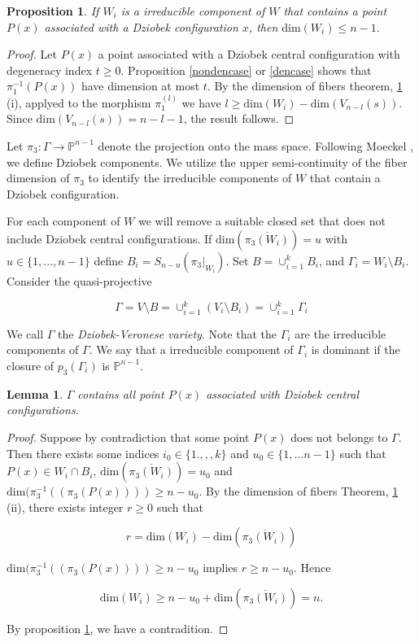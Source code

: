 \documentclass{amsart}
\newtheorem{proposition}[theorem]{Proposition}
\newtheorem{lemma}[theorem]{Lemma}
\theoremstyle{definition}
\theoremstyle{remark}
\numberwithin{equation}{section}
\begin{document}
\begin{proposition}\label{dimfiber}
If $W_i$ is a irreducible component of $W$ that contains a point $P(x)$ associated with a Dziobek configuration $x$, then $\text{dim}(W_i)\leq n-1.$
\end{proposition}
\begin{proof}

 Let $P(x)$ a point associated with a Dziobek central configuration with degeneracy index $t \geq 0$. Proposition \ref{nondencase} or \ref{dencase} shows that $\pi_1^{-1}(P(x))$ have dimension at most $t$. By the dimension of fibers theorem, \ref{dimfiber} (i), applyed to the morphism $\pi_1^{(l)}$ we have $l \geq \text{dim}(W_i)-\text{dim}(V_{n-l}(s))$. Since $\text{dim}(V_{n-l}(s))=n-l-1$, the result follows.
 
\end{proof}





Let $\pi_3: \Gamma \to \mathbb{P}^{n-1}$ denote the projection onto the mass space.  Following Moeckel \cite{moeckel2001generic}, we define Dziobek components. We utilize the upper semi-continuity of the fiber dimension of $\pi_3$ to identify the irreducible components of $W$ that contain a Dziobek configuration.

 For each component of $W$ we will remove a suitable closed set that does not include Dziobek central configurations. If $\text{dim}(\overline{\pi_3(W_i)})=u$ with $u \in\{1,...,n-1\}$ define $B_i=S_{n-u}(\pi_3|_{W_i})$. Set
 $B=\cup_{i=1}^{k}B_i$, and $\Gamma_i=W_i \setminus B_i$. Consider the quasi-projective 

$$\Gamma= V\setminus B=\cup_{i=1}^{k} (V_{i} \setminus B_i)=\cup_{i=1}^k \Gamma_i$$

We call $\Gamma$ the \emph{Dziobek-Veronese variety}. Note that the $\Gamma_i$ are the irreducible components of $\Gamma.$ We say that a irreducible component of $\Gamma_i$ is dominant if the closure of $p_3(\Gamma_i)$ is $\mathbb{P}^{n-1}$.

\begin{lemma} 
  $\Gamma$ contains all point $P(x)$ associated with Dziobek central configurations.
\end{lemma}

\begin{proof}
Suppose by contradiction that some point $P(x)$ does not belongs to $\Gamma$. Then there exists some indices $i_0 \in \{1.,,,k\}$ and $u_0 \in \{1,\dots n-1\}$ such that $P(x) \in W_i \cap B_i$,  $\text{dim}(\overline{\pi_3(W_i)})=u_0$ and 
$\text{dim}(\pi_3^{-1}((\pi_3(P(x)))) \geq n-u_0$. By the dimension of fibers Theorem, \ref{dimfiber}  (ii), there exists integer $r \geq 0$ such that

$$r=\text{dim}(W_i)-\text{dim}(\overline{\pi_3(W_i)})$$

$\text{dim}(\pi_3^{-1}((\pi_3(P(x)))) \geq n-u_0$ implies $r \geq n-u_0$. Hence

$$\text{dim}(W_i) \geq n-u_0+\text{dim}(\overline{\pi_3(W_i)})=n.$$

By proposition \ref{dimfiber}, we have a contradition.
\end{proof}
\end{document}
